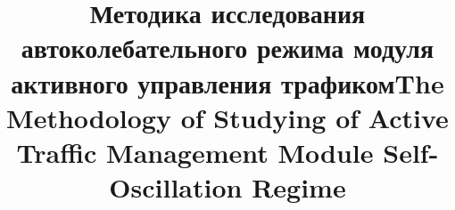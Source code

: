 \begin{Russian}
\begin{Vestnik}
\end{Vestnik}
\end{Russian}

\begin{Russian}
\title{Методика исследования автоколебательного режима модуля активного управления трафиком}
\end{Russian}
\begin{English}
\title{The Methodology of Studying of Active Traffic Management Module Self-Oscillation Regime}
\end{English}

